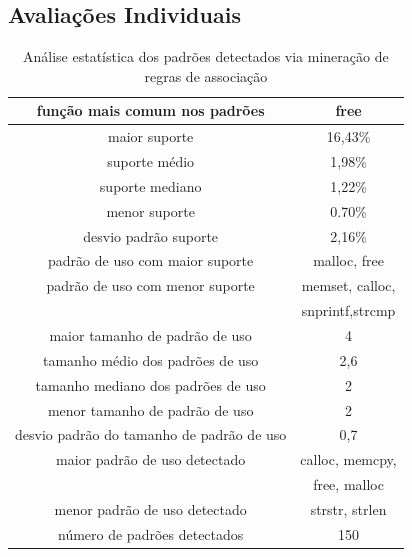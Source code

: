 \subsection{Avaliações Individuais}
\begin{table}[H]
\centering
\begin{tabular}{ | c | c |}
  \hline
  função mais comum nos padrões & free \\
  \hline
  maior suporte & 16,43\% \\
  \hline
  suporte médio & 1,98\% \\
  \hline
  suporte mediano & 1,22\% \\
  \hline
  menor suporte & 0.70\% \\
  \hline
  desvio padrão suporte & 2,16\% \\
  \hline
  padrão de uso com maior suporte & malloc, free\\
  \hline
  padrão de uso com menor suporte & memset, calloc, \\
   & snprintf,strcmp\\
  \hline
  maior tamanho de padrão de uso & 4 \\
  \hline
  tamanho médio dos padrões de uso & 2,6 \\
  \hline
  tamanho mediano dos padrões de uso & 2\\
  \hline
  menor tamanho de padrão de uso & 2\\
  \hline
  desvio padrão do tamanho de padrão de uso & 0,7 \\
  \hline
  maior padrão de uso detectado & calloc, memcpy, \\
  &  free, malloc\\
  \hline
  menor padrão de uso detectado & strstr, strlen\\
  \hline
  número de padrões detectados & 150 \\
  \hline
\end{tabular}
\caption{Análise estatística dos padrões detectados via mineração de regras de associação}
\label{desc_item}
\end{table}

